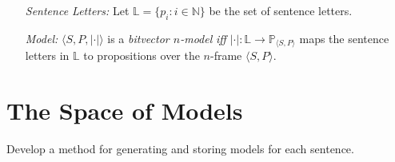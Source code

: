 \documentclass[a4paper, 11pt]{article} %
\newcommand{\tuple}[1]{\langle#1\rangle} %
\newcommand{\set}[1]{\lbrace#1\rbrace} %
\renewcommand{\P}[0]{\mathbb{P}}
\renewcommand{\L}[0]{\mathbb{L}}
\newcommand{\N}[0]{\mathbb{N}}
\renewcommand{\vert}[1]{\lvert#1\rvert}
\begin{document}
\begin{enumerate}
  \item[\it Sentence Letters:] Let $\L=\set{p_i:i\in\N}$ be the set of sentence letters.
  \item[\it Model:] $\tuple{S,P,\vert{\cdot}}$ is a \textit{bitvector $n$-model} \textit{iff} $\vert{\cdot}:\L\to\P_{\tuple{S,P}}$ maps the sentence letters in $\L$ to propositions over the $n$-frame $\tuple{S,P}$.
\end{enumerate}




\section{The Space of Models}

Develop a method for generating and storing models for each sentence.
\end{document}
